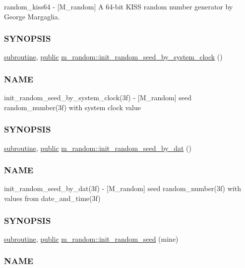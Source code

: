 \begin{DoxyCompactItemize}
\begin{DoxyCompactList}
random\+\_\+kiss64 -\/ \mbox{[}M\+\_\+random\mbox{]} A 64-\/bit K\+I\+SS random number generator by George Margaglia. \subsubsection*{S\+Y\+N\+O\+P\+S\+IS}\end{DoxyCompactList}\item 
\hyperlink{M__stopwatch_83_8txt_acfbcff50169d691ff02d4a123ed70482}{subroutine}, \hyperlink{M__stopwatch_83_8txt_a2f74811300c361e53b430611a7d1769f}{public} \hyperlink{namespacem__random_a887216bea7a75b314e538afd3ebe2ff3}{m\+\_\+random\+::init\+\_\+random\+\_\+seed\+\_\+by\+\_\+system\+\_\+clock} ()
\begin{DoxyCompactList}\small\item\em \subsubsection*{N\+A\+ME}

init\+\_\+random\+\_\+seed\+\_\+by\+\_\+system\+\_\+clock(3f) -\/ \mbox{[}M\+\_\+random\mbox{]} seed random\+\_\+number(3f) with system clock value \subsubsection*{S\+Y\+N\+O\+P\+S\+IS}\end{DoxyCompactList}\item 
\hyperlink{M__stopwatch_83_8txt_acfbcff50169d691ff02d4a123ed70482}{subroutine}, \hyperlink{M__stopwatch_83_8txt_a2f74811300c361e53b430611a7d1769f}{public} \hyperlink{namespacem__random_a6e3975f994c77778043f3e5d00614317}{m\+\_\+random\+::init\+\_\+random\+\_\+seed\+\_\+by\+\_\+dat} ()
\begin{DoxyCompactList}\small\item\em \subsubsection*{N\+A\+ME}

init\+\_\+random\+\_\+seed\+\_\+by\+\_\+dat(3f) -\/ \mbox{[}M\+\_\+random\mbox{]} seed random\+\_\+number(3f) with values from date\+\_\+and\+\_\+time(3f) \subsubsection*{S\+Y\+N\+O\+P\+S\+IS}\end{DoxyCompactList}\item 
\hyperlink{M__stopwatch_83_8txt_acfbcff50169d691ff02d4a123ed70482}{subroutine}, \hyperlink{M__stopwatch_83_8txt_a2f74811300c361e53b430611a7d1769f}{public} \hyperlink{namespacem__random_af867f4abf9b4006b89e0ca160fc1b61a}{m\+\_\+random\+::init\+\_\+random\+\_\+seed} (mine)
\begin{DoxyCompactList}\small\item\em \subsubsection*{N\+A\+ME}


\end{DoxyCompactList}
\end{DoxyCompactItemize}
